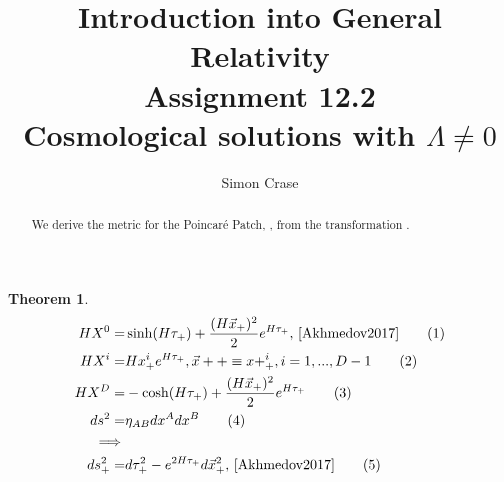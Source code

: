 \documentclass[]{article}
\title{Introduction into General Relativity\\Assignment 12.2\\Cosmological solutions with $\Lambda\ne 0$}
\author{Simon Crase}
\newtheorem{theorem}{Theorem}
\newcommand\numberthis{\addtocounter{equation}{1}\tag{\theequation}}
\begin{document}
\maketitle

\begin{abstract}
	We derive the metric for the Poincar\'e Patch, \cite[XII,(332)]{Akhmedov2017}, from the transformation \cite[XII,(333)]{Akhmedov2017}.
\end{abstract}

\begin{theorem}
	\begin{align*}
	HX^0=&\sinh(H\tau_+)+\frac{(H\vec{x}_+)^2}{2}e^{H\tau_+}\text{, \cite[XII,(333)]{Akhmedov2017}}\numberthis\label{eq:x0}\\
	HX^i=&Hx^i_+e^{H\tau_+}, \vec{x}++\equiv x+^i_+, i=1,...,D-1\numberthis\label{eq:xi}\\
	HX^D=&-\cosh(H\tau_+)+\frac{(H\vec{x}_+)^2}{2}e^{H\tau_+}\numberthis\label{eq:xD}\\
	ds^2=&\eta_{AB}dx^Adx^B\numberthis\label{eq:ds}\\
	\implies&\\
	ds^2_+=&d\tau^2_+ - e^{2H\tau_+}d\vec{x}^2_+\text{, \cite[XII,(332)]{Akhmedov2017}}	\numberthis\label{eq:demonstandem}
	\end{align*}
\end{theorem}
\end{document}
